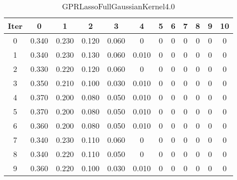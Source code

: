 \begin{table}
	\begin{center}
		\begin{tabular}{|c|c|c|c|c|c|c|c|c|c|c|c|}
			\hline
			Iter & 0 & 1 & 2 & 3 & 4 & 5 & 6 & 7 & 8 & 9 & 10 \\
			\hline
			0 & 0.340 & 0.230 & 0.120 & 0.060 & 0 & 0 & 0 & 0 & 0 & 0 & 0 \\
			\hline
			1 & 0.340 & 0.230 & 0.130 & 0.060 & 0.010 & 0 & 0 & 0 & 0 & 0 & 0 \\
			\hline
			2 & 0.330 & 0.220 & 0.120 & 0.060 & 0 & 0 & 0 & 0 & 0 & 0 & 0 \\
			\hline
			3 & 0.350 & 0.210 & 0.100 & 0.030 & 0.010 & 0 & 0 & 0 & 0 & 0 & 0 \\
			\hline
			4 & 0.370 & 0.200 & 0.080 & 0.050 & 0.010 & 0 & 0 & 0 & 0 & 0 & 0 \\
			\hline
			5 & 0.370 & 0.200 & 0.080 & 0.050 & 0.010 & 0 & 0 & 0 & 0 & 0 & 0 \\
			\hline
			6 & 0.360 & 0.200 & 0.080 & 0.050 & 0.010 & 0 & 0 & 0 & 0 & 0 & 0 \\
			\hline
			7 & 0.340 & 0.230 & 0.110 & 0.060 & 0 & 0 & 0 & 0 & 0 & 0 & 0 \\
			\hline
			8 & 0.340 & 0.220 & 0.110 & 0.050 & 0 & 0 & 0 & 0 & 0 & 0 & 0 \\
			\hline
			9 & 0.360 & 0.220 & 0.100 & 0.030 & 0.010 & 0 & 0 & 0 & 0 & 0 & 0 \\
			\hline
		\end{tabular}
	\end{center}
	\caption{GPRLassoFullGaussianKernel4.0}
\end{table}